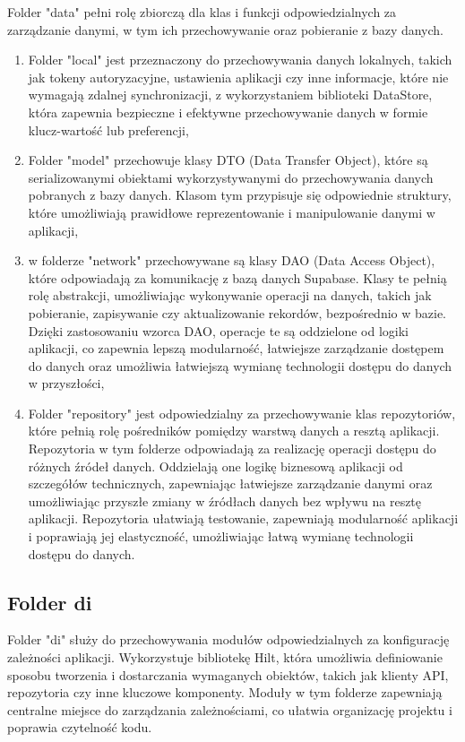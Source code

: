\documentclass[12pt,twoside]{article}
\begin{document}
Folder "data" pełni rolę zbiorczą dla klas i funkcji odpowiedzialnych za zarządzanie danymi, w tym ich przechowywanie 
oraz pobieranie z bazy danych.
\begin{samepage}
\begin{enumerate}[label=\alph*), leftmargin=1.25cm]
	\item Folder "local" jest przeznaczony do przechowywania danych lokalnych, takich jak tokeny autoryzacyjne, 
	ustawienia aplikacji czy inne informacje, które nie wymagają zdalnej synchronizacji, z wykorzystaniem biblioteki 
	DataStore, która zapewnia bezpieczne i efektywne przechowywanie danych w formie klucz-wartość lub preferencji,
	\item Folder "model" przechowuje klasy DTO (Data Transfer Object), które są serializowanymi obiektami 
	wykorzystywanymi do przechowywania danych pobranych z bazy danych. Klasom tym przypisuje się odpowiednie 
	struktury, które umożliwiają prawidłowe reprezentowanie i manipulowanie danymi w aplikacji,
	\item w folderze "network" przechowywane są klasy DAO (Data Access Object), które odpowiadają za komunikację z 
	bazą danych Supabase. Klasy te pełnią rolę abstrakcji, umożliwiając wykonywanie operacji na danych, takich jak 
	pobieranie, zapisywanie czy aktualizowanie rekordów, bezpośrednio w bazie. Dzięki zastosowaniu wzorca DAO, 
	operacje te są oddzielone od logiki aplikacji, co zapewnia lepszą modularność, łatwiejsze zarządzanie dostępem do 
	danych oraz umożliwia łatwiejszą wymianę technologii dostępu do danych w przyszłości,
	\item Folder "repository" jest odpowiedzialny za przechowywanie klas repozytoriów, które pełnią rolę pośredników 
	pomiędzy warstwą danych a resztą aplikacji. Repozytoria w tym folderze odpowiadają za realizację operacji dostępu 
	do różnych źródeł danych. Oddzielają one logikę biznesową aplikacji od szczegółów technicznych, zapewniając 
	łatwiejsze zarządzanie danymi oraz umożliwiając przyszłe zmiany w źródłach danych bez wpływu na resztę aplikacji. 
	Repozytoria ułatwiają testowanie, zapewniają modularność aplikacji i poprawiają jej elastyczność, umożliwiając 
	łatwą wymianę technologii dostępu do danych.
\end{enumerate}
\end{samepage}
\subsection{Folder di}

Folder "di" służy do przechowywania modułów odpowiedzialnych za konfigurację zależności aplikacji. Wykorzystuje 
bibliotekę Hilt, która umożliwia definiowanie sposobu tworzenia i dostarczania wymaganych obiektów, takich jak 
klienty API, repozytoria czy inne kluczowe komponenty. Moduły w tym folderze zapewniają centralne miejsce do 
zarządzania zależnościami, co ułatwia organizację projektu i poprawia czytelność kodu.
\end{document}
